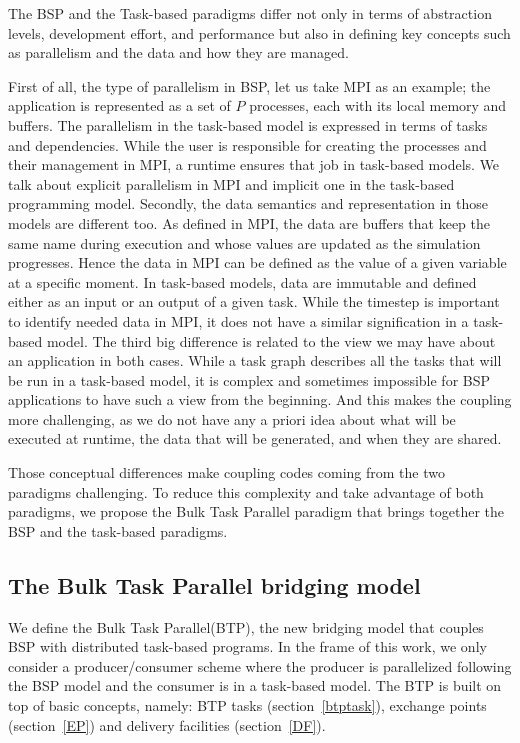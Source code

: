 
The BSP and the Task-based paradigms differ not only in terms of abstraction levels, development effort, and performance but also in defining key concepts such as parallelism and the data and how they are managed.

First of all, the type of parallelism in BSP, let us take MPI as an example; the application is represented as a set of $P$ processes, each with its local memory and buffers. The parallelism in the task-based model is expressed in terms of tasks and dependencies. While the user is responsible for creating the processes and their management in MPI, a runtime ensures that job in task-based models. We talk about explicit parallelism in MPI and implicit one in the task-based programming model. 
Secondly, the data semantics and representation in those models are different too. As defined in MPI, the data are buffers that keep the same name during execution and whose values are updated as the simulation progresses. Hence the data in MPI can be defined as the value of a given variable at a specific moment.
In task-based models, data are immutable and defined either as an input or an output of a given task. While the timestep is important to identify needed data in MPI, it does not have a similar signification in a task-based model. 
The third big difference is related to the view we may have about an application in both cases. While a task graph describes all the tasks that will be run in a task-based model, it is complex and sometimes impossible for BSP applications to have such a view from the beginning. And this makes the coupling more challenging, as we do not have any a priori idea about what will be executed at runtime, the data that will be generated, and when they are shared.

Those conceptual differences make coupling codes coming from the two paradigms challenging. To reduce this complexity and take advantage of both paradigms, we propose the Bulk Task Parallel paradigm that brings together the BSP and the task-based paradigms. 


\subsection{The Bulk Task Parallel bridging model}\label{sec:btp:btpmdel}

We define the Bulk Task Parallel(BTP), the new bridging model that couples BSP with distributed task-based programs. In the frame of this work, we only consider a producer/consumer scheme where the producer is parallelized following the BSP model and the consumer is in a task-based model.  The BTP is built on top of basic concepts, namely: BTP tasks (section~\ref{btptask}), exchange points (section~\ref{EP}) and delivery facilities (section~\ref{DF}).  

